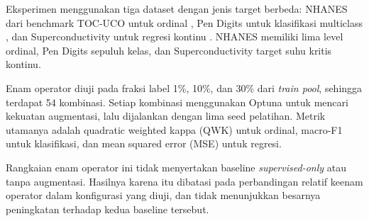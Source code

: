 Eksperimen menggunakan tiga dataset dengan jenis target berbeda: NHANES dari benchmark TOC-UCO untuk ordinal \cite{ref14}, Pen Digits untuk klasifikasi multiclass \cite{ref15}, dan Superconductivity untuk regresi kontinu \cite{ref16}. NHANES memiliki lima level ordinal, Pen Digits sepuluh kelas, dan Superconductivity target suhu kritis kontinu.

Enam operator diuji pada fraksi label 1\%, 10\%, dan 30\% dari \textit{train pool}, sehingga terdapat 54 kombinasi. Setiap kombinasi menggunakan Optuna untuk mencari kekuatan augmentasi, lalu dijalankan dengan lima seed pelatihan. Metrik utamanya adalah quadratic weighted kappa (QWK) untuk ordinal, macro-F1 untuk klasifikasi, dan mean squared error (MSE) untuk regresi.

Rangkaian enam operator ini tidak menyertakan baseline \textit{supervised-only} atau tanpa augmentasi. Hasilnya karena itu dibatasi pada perbandingan relatif keenam operator dalam konfigurasi yang diuji, dan tidak menunjukkan besarnya peningkatan terhadap kedua baseline tersebut.
